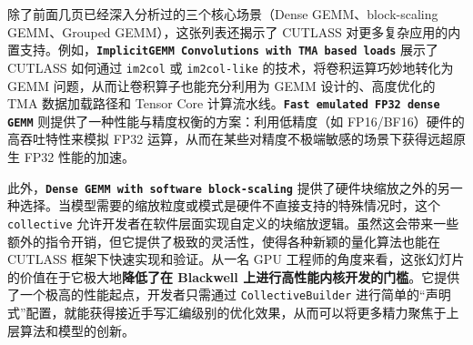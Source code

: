 除了前面几页已经深入分析过的三个核心场景（Dense GEMM、block-scaling GEMM、Grouped GEMM），这张列表还揭示了 CUTLASS 对更多复杂应用的内置支持。例如，\textbf{\texttt{I\allowbreak{}m\allowbreak{}p\allowbreak{}l\allowbreak{}i\allowbreak{}c\allowbreak{}i\allowbreak{}t\allowbreak{}G\allowbreak{}E\allowbreak{}M\allowbreak{}M\allowbreak{} \allowbreak{}C\allowbreak{}o\allowbreak{}n\allowbreak{}v\allowbreak{}o\allowbreak{}l\allowbreak{}u\allowbreak{}t\allowbreak{}i\allowbreak{}o\allowbreak{}n\allowbreak{}s\allowbreak{} \allowbreak{}w\allowbreak{}i\allowbreak{}t\allowbreak{}h\allowbreak{} \allowbreak{}T\allowbreak{}M\allowbreak{}A\allowbreak{} \allowbreak{}b\allowbreak{}a\allowbreak{}s\allowbreak{}e\allowbreak{}d\allowbreak{} \allowbreak{}l\allowbreak{}o\allowbreak{}a\allowbreak{}d\allowbreak{}s}} 展示了 CUTLASS 如何通过 \texttt{im2col} 或 \texttt{im2col-like} 的技术，将卷积运算巧妙地转化为 GEMM 问题，从而让卷积算子也能充分利用为 GEMM 设计的、高度优化的 TMA 数据加载路径和 Tensor Core 计算流水线。\textbf{\texttt{F\allowbreak{}a\allowbreak{}s\allowbreak{}t\allowbreak{} \allowbreak{}e\allowbreak{}m\allowbreak{}u\allowbreak{}l\allowbreak{}a\allowbreak{}t\allowbreak{}e\allowbreak{}d\allowbreak{} \allowbreak{}F\allowbreak{}P\allowbreak{}3\allowbreak{}2\allowbreak{} \allowbreak{}d\allowbreak{}e\allowbreak{}n\allowbreak{}s\allowbreak{}e\allowbreak{} \allowbreak{}G\allowbreak{}E\allowbreak{}M\allowbreak{}M}} 则提供了一种性能与精度权衡的方案：利用低精度（如 FP16/\allowbreak{}BF16）硬件的高吞吐特性来模拟 FP32 运算，从而在某些对精度不极端敏感的场景下获得远超原生 FP32 性能的加速。

此外，\textbf{\texttt{D\allowbreak{}e\allowbreak{}n\allowbreak{}s\allowbreak{}e\allowbreak{} \allowbreak{}G\allowbreak{}E\allowbreak{}M\allowbreak{}M\allowbreak{} \allowbreak{}w\allowbreak{}i\allowbreak{}t\allowbreak{}h\allowbreak{} \allowbreak{}s\allowbreak{}o\allowbreak{}f\allowbreak{}t\allowbreak{}w\allowbreak{}a\allowbreak{}r\allowbreak{}e\allowbreak{} \allowbreak{}b\allowbreak{}l\allowbreak{}o\allowbreak{}c\allowbreak{}k\allowbreak{}-\allowbreak{}s\allowbreak{}c\allowbreak{}a\allowbreak{}l\allowbreak{}i\allowbreak{}n\allowbreak{}g}} 提供了硬件块缩放之外的另一种选择。当模型需要的缩放粒度或模式是硬件不直接支持的特殊情况时，这个 \texttt{collective} 允许开发者在软件层面实现自定义的块缩放逻辑。虽然这会带来一些额外的指令开销，但它提供了极致的灵活性，使得各种新颖的量化算法也能在 CUTLASS 框架下快速实现和验证。从一名 GPU 工程师的角度来看，这张幻灯片的价值在于它极大地\textbf{降低了在 Blackwell 上进行高性能内核开发的门槛}。它提供了一个极高的性能起点，开发者只需通过 \texttt{Collective\allowbreak{}Builder} 进行简单的“声明式”配置，就能获得接近手写汇编级别的优化效果，从而可以将更多精力聚焦于上层算法和模型的创新。

